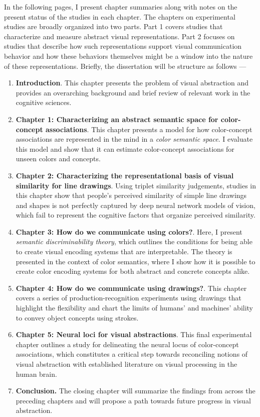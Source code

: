 \documentclass{Dissertate}
\begin{document}
In the following pages, I present chapter summaries along with notes on the present status of the studies in each chapter. The chapters on experimental studies are broadly organized into two parts. Part 1 covers studies that characterize and measure abstract visual representations.
Part 2 focuses on studies that describe how such representations support visual communication behavior and how these behaviors themselves might be a window into the nature of these representations.
Briefly, the dissertation will be structure as follows —
\begin{enumerate}
    \item \textbf{Introduction}. This chapter presents the problem of visual abstraction and provides an overarching background and brief review of relevant work in the cognitive sciences.
    \item \textbf{Chapter 1: Characterizing an abstract semantic space for
color-concept associations}. This chapter presents a model for how color-concept associations are represented in the mind in a \textit{color semantic space}. I evaluate this model and show that it can estimate color-concept associations for unseen colors and concepts.
\item \textbf{Chapter 2: Characterizing the representational basis of visual similarity for line drawings}. Using triplet similarity judgements, studies in this chapter show that people's perceived similarity of simple line drawings and shapes is not perfectly captured by deep neural network models of vision, which fail to represent the cognitive factors that organize perceived similarity.
\item \textbf{Chapter 3: How do we communicate using colors?}. Here, I present \textit{semantic discriminability theory}, which outlines the conditions for being able to create visual encoding systems that are interpretable.
The theory is presented in the context of color semantics, where I show how it is possible to create color encoding systems for both abstract and concrete concepts alike.
\item \textbf{Chapter 4: How do we communicate using drawings?}. This chapter covers a series of production-recognition experiments using drawings that highlight the flexibility and chart the limits of humans' and machines' ability to convey object concepts using strokes.

\item \textbf{Chapter 5: Neural loci for visual abstractions}. This final experimental chapter outlines a study for delineating the neural locus of color-concept associations, which constitutes a critical step towards reconciling notions of visual abstraction with established literature on visual processing in the human brain.
\item \textbf{Conclusion.} The closing chapter will summarize the findings from across the preceding chapters and will propose a path towards future progress in visual abstraction.


\end{enumerate}
\end{document}
